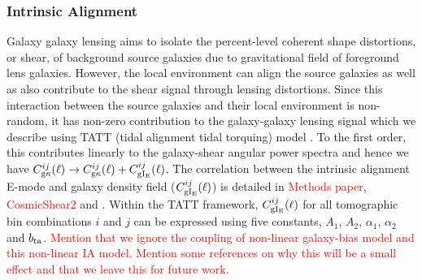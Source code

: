 \documentclass[fleqn,usenatbib]{mnras}
\newcommand{\red}[1]{\textcolor{red}{#1}}
\begin{document}
\subsubsection{Intrinsic Alignment} 
Galaxy galaxy lensing aims to isolate the percent-level coherent shape distortions, or shear, of background source galaxies due to gravitational field of foreground lens galaxies. However, the local environment can align the source galaxies as well as also contribute to the shear signal through lensing distortions. Since this interaction between the source galaxies and their local environment is non-random, it has non-zero contribution to the galaxy-galaxy lensing signal which we describe using TATT (tidal alignment tidal torquing) model \citep{Blazek_2019}. To the first order, this contributes linearly to the galaxy-shear angular power spectra and hence we have $C^{ij}_{\rm g\kappa}(\ell) \to C^{ij}_{\rm g\kappa}(\ell) + C^{ij}_{\rm gI_{\rm E}}(\ell)$. The correlation between the intrinsic alignment E-mode and galaxy density field ($C^{ij}_{\rm gI_{\rm E}}(\ell)$) is detailed in \red{Methods paper}, \red{CosmicShear2} and \citet{Blazek_2019}. Within the TATT framework, $C^{ij}_{\rm gI_{\rm E}}(\ell)$ for all tomographic bin combinations $i$ and $j$ can be expressed using five constants, $A_1$, $A_2$, $\alpha_1$, $\alpha_2$ and $b_{\rm ta}$. \red{Mention that we ignore the coupling of non-linear galaxy-bias model and this non-linear IA model. Mention some references on why this will be a small effect and that we leave this for future work.}
\end{document}
